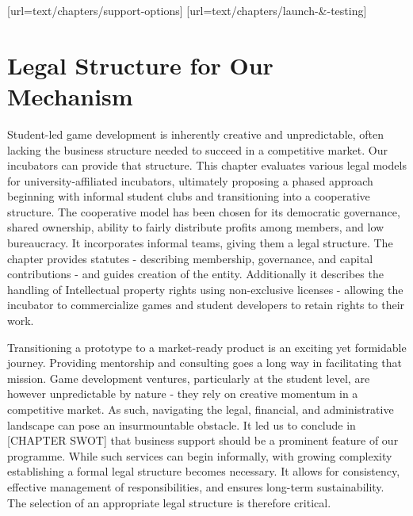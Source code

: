 [url=text/chapters/support-options]
[url=text/chapters/launch-&-testing]
\chapter{Legal Structure for Our Mechanism}

\begin{chapterabstract}	
    Student-led game development is inherently creative and unpredictable, often lacking the business structure needed to succeed in a competitive market. Our incubators can provide that structure. This chapter evaluates various legal models for university-affiliated incubators, ultimately proposing a phased approach beginning with informal student clubs and transitioning into a cooperative structure. The cooperative model has been chosen for its democratic governance, shared ownership, ability to fairly distribute profits among members, and low bureaucracy. It incorporates informal teams, giving them a legal structure. The chapter provides statutes - describing membership, governance, and capital contributions - and guides creation of the entity. Additionally it describes the handling of Intellectual property rights using non-exclusive licenses - allowing the incubator to commercialize games and student developers to retain rights to their work.
\end{chapterabstract}

Transitioning a prototype to a market-ready product is an exciting yet formidable journey. Providing mentorship and consulting goes a long way in facilitating that mission. Game development ventures, particularly at the student level, are however unpredictable by nature - they rely on creative momentum in a competitive market. As such, navigating the legal, financial, and administrative landscape can pose an insurmountable obstacle. It led us to conclude in [CHAPTER SWOT] that business support should be a prominent feature of our programme. While such services can begin informally, with growing complexity establishing a formal legal structure becomes necessary. It allows for consistency, effective management of responsibilities, and ensures long-term sustainability. The selection of an appropriate legal structure is therefore critical.

